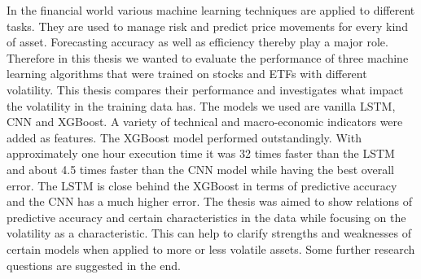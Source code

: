 \documentclass[a4paper,12pt]{report}
\begin{document}
In the financial world various machine learning techniques are applied to different tasks. They are used to manage risk and predict price movements for every kind of asset. Forecasting accuracy as well as efficiency thereby play a major role. Therefore in this thesis we wanted to evaluate the performance of three machine learning algorithms that were trained on stocks and ETFs with different volatility. This thesis compares their performance and investigates what impact the volatility in the training data has. The models we used are vanilla LSTM, CNN and XGBoost. A variety of technical and macro-economic indicators were added as features. The XGBoost model performed outstandingly. With approximately one hour execution time it was 32 times faster than the LSTM and about 4.5 times faster than the CNN model while having the best overall error. The LSTM is close behind the XGBoost in terms of predictive accuracy and the CNN has a much higher error. The thesis was aimed to show relations of predictive accuracy and certain characteristics in the data while focusing on the volatility as a characteristic. This can help to clarify strengths and weaknesses of certain models when applied to more or less volatile assets. Some further research questions are suggested in the end.
\vspace{6cm}
\vspace*{\fill}
\end{document}
